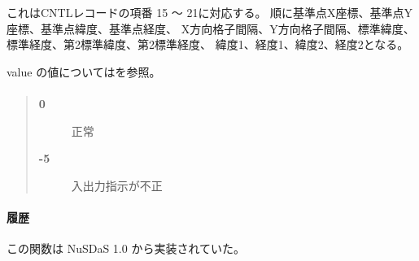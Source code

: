 これはCNTLレコードの項番 15 〜 21に対応する。
順に基準点X座標、基準点Y座標、基準点緯度、基準点経度、
X方向格子間隔、Y方向格子間隔、標準緯度、標準経度、第2標準緯度、第2標準経度、
緯度1、経度1、緯度2、経度2となる。

value の値についてはを参照。

\paragraph{\ResultCode}
\begin{quote}
\begin{description}
\item[{\bf 0}] 正常
\item[{\bf -5}] 入出力指示が不正
\end{description}\end{quote}
\paragraph{ 履歴 }
この関数は NuSDaS 1.0 から実装されていた。
